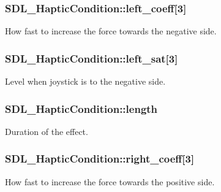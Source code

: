\subsubsection[{left\+\_\+coeff}]{ S\+D\+L\+\_\+\+Haptic\+Condition\+::left\+\_\+coeff\mbox{[}3\mbox{]}}\label{structSDL__HapticCondition_a2adf52c32f60f0b6826b1e3add2eae7a}
How fast to increase the force towards the negative side. \hypertarget{structSDL__HapticCondition_a953448774c40818a4f47c6efea21124d}{}
\subsubsection[{left\+\_\+sat}]{ S\+D\+L\+\_\+\+Haptic\+Condition\+::left\+\_\+sat\mbox{[}3\mbox{]}}\label{structSDL__HapticCondition_a953448774c40818a4f47c6efea21124d}
Level when joystick is to the negative side. \hypertarget{structSDL__HapticCondition_ad0efb0a6ddc20f058e87199eaaa95978}{}
\subsubsection[{length}]{ S\+D\+L\+\_\+\+Haptic\+Condition\+::length}\label{structSDL__HapticCondition_ad0efb0a6ddc20f058e87199eaaa95978}
Duration of the effect. \hypertarget{structSDL__HapticCondition_a3de7f164ef88841255535387d0f100b6}{}
\subsubsection[{right\+\_\+coeff}]{ S\+D\+L\+\_\+\+Haptic\+Condition\+::right\+\_\+coeff\mbox{[}3\mbox{]}}\label{structSDL__HapticCondition_a3de7f164ef88841255535387d0f100b6}
How fast to increase the force towards the positive side. \hypertarget{structSDL__HapticCondition_a90427a1e0d464b4b53abc1d419c97b2e}{}

